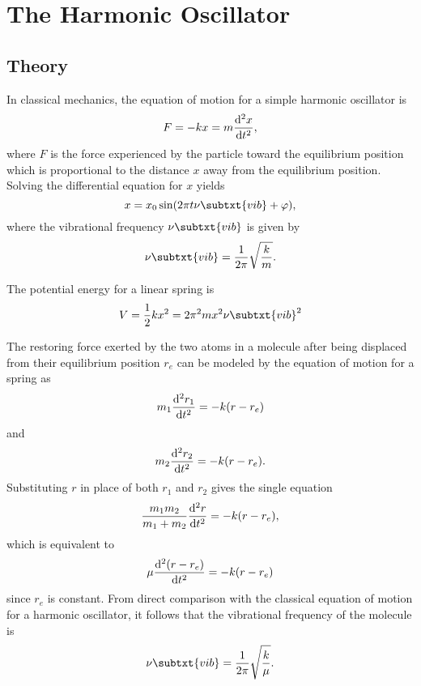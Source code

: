\section{The Harmonic Oscillator}
\label{s:the_harmonic_oscillator}

\subsection{Theory}

In classical mechanics, the equation of motion for a simple harmonic oscillator is
\begin{equation*}
    F = -kx = m\odv[2]{x}{t},
\end{equation*}
where $F$ is the force experienced by the particle toward the equilibrium position which is proportional to the distance $x$ away from the equilibrium position. Solving the differential equation for $x$ yields
\begin{equation*}
    x = x_0\sin(2\pi t\nu\subtxt{vib} + \varphi),
\end{equation*}
where the vibrational frequency $\nu\subtxt{vib}$ is given by
\begin{equation*}
    \nu\subtxt{vib} = \frac{1}{2\pi}\sqrt{\frac{k}{m}}.
\end{equation*}

The potential energy for a linear spring is
\begin{equation*}
    V = \frac{1}{2}kx^2 = 2\pi^2mx^2\nu\subtxt{vib}^2
\end{equation*}

The restoring force exerted by the two atoms in a molecule after being displaced from their equilibrium position $r_e$ can be modeled by the equation of motion for a spring as
\begin{equation*}
    m_1\odv[2]{r_1}{t} = -k(r - r_e)
\end{equation*}
and
\begin{equation*}
    m_2\odv[2]{r_2}{t} = -k(r - r_e).
\end{equation*}
Substituting $r$ in place of both $r_1$ and $r_2$ gives the single equation
\begin{equation*}
    \frac{m_1m_2}{m_1 + m_2}\odv[2]{r}{t} = -k(r - r_e),
\end{equation*}
which is equivalent to
\begin{equation*}
    \mu\odv[2]{(r - r_e)}{t} = -k(r - r_e)
\end{equation*}
since $r_e$ is constant. From direct comparison with the classical equation of motion for a harmonic oscillator, it follows that the vibrational frequency of the molecule is
\begin{equation*}
    \nu\subtxt{vib} = \frac{1}{2\pi}\sqrt{\frac{k}{\mu}}.
\end{equation*}

